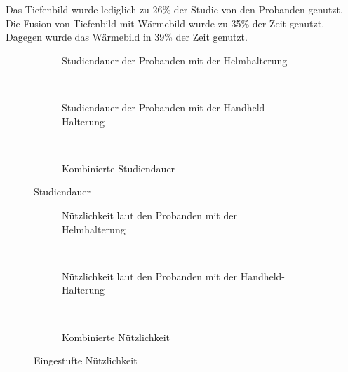 Das Tiefenbild wurde lediglich zu 26\% der Studie von den Probanden genutzt.
Die Fusion von Tiefenbild mit Wärmebild wurde zu 35\% der Zeit genutzt.
Dagegen wurde das Wärmebild in 39\% der Zeit genutzt.

\begin{figure}[H]
	\centering
	\begin{subfigure}[t]{0.3\textwidth}
		\centering
		\caption{Studiendauer der Probanden mit der Helmhalterung}
		\label{fig:study2_head_duration}
	\end{subfigure}
	~
	\begin{subfigure}[t]{0.3\textwidth}
		\centering
		\caption{Studiendauer der Probanden mit der Handheld-Halterung}
		\label{fig:study2_hand_duration}
	\end{subfigure}
	~
	\begin{subfigure}[t]{0.3\textwidth}
		\centering
		\caption{Kombinierte Studiendauer}
		\label{fig:study2_both_duration}
	\end{subfigure}
	\caption{Studiendauer}
	\label{fig:study2_duration}
\end{figure}

\begin{figure}[H]
	\centering
	\begin{subfigure}[t]{0.3\textwidth}
		\centering
		\caption{Nützlichkeit laut den Probanden mit der Helmhalterung}
		\label{fig:study2_head_use}
	\end{subfigure}
	~
	\begin{subfigure}[t]{0.3\textwidth}
		\centering
		\caption{Nützlichkeit laut den Probanden mit der Handheld-Halterung}
		\label{fig:study2_hand_use}
	\end{subfigure}
	~
	\begin{subfigure}[t]{0.3\textwidth}
		\centering
		\caption{Kombinierte Nützlichkeit}
		\label{fig:study2_both_use}
	\end{subfigure}
	\caption{Eingestufte Nützlichkeit}
	\label{fig:study2_use}
\end{figure}

